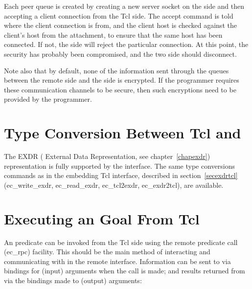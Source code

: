 Each peer queue is created by creating a new server socket on the
{\eclipse} side and then accepting a client connection from the Tcl
side. The accept command is told where the client connection is from, and
the client host is checked against the client's host from the attachment,
to ensure that the same host has been connected. If not, the {\eclipse}
side will reject the particular connection. At this point, the security has
probably been compromised, and the two side should disconnect.

Note also that by default, none of the information sent through the queues
between the remote side and the {\eclipse} side is encrypted. If the
programmer requires these communication channels to be secure, then such
encryptions need to be provided by the programmer.

\section{Type Conversion Between Tcl and {\eclipse}}

The EXDR ({\eclipse} External Data Representation, see
chapter~\ref{chapexdr}) representation is fully supported by the
interface. The same type conversions commands as in the embedding Tcl
interface, described in section~\ref{secexdrtcl}
(ec_write_exdr, ec_read_exdr, ec_tcl2exdr, ec_exdr2tcl), are available.

\section{Executing an {\eclipse} Goal From Tcl}

An {\eclipse} predicate can be invoked from the Tcl side using the
remote {\eclipse} predicate call (ec_rpc) facility. This should be the
main method of interacting and communicating with {\eclipse} in the remote
interface. Information can be sent to {\eclipse} via bindings for (input)
arguments when the call is made; and
results returned from {\eclipse} via the bindings made to (output)
arguments:

